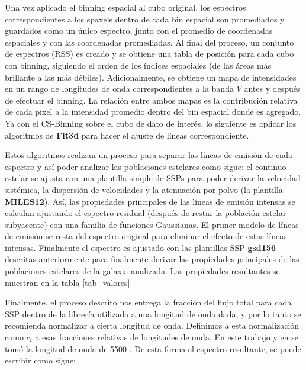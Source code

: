 \bigskip

\noindent Una  vez aplicado el binning espacial al cubo original, los espectros correspondientes a los spaxels dentro de cada bin espacial son promediados y guardados como un único espectro, junto con el promedio de coordenadas espaciales y con las coordenadas promediadas. Al final del proceso, un conjunto de espectros (RSS) es creado y se obtiene una tabla de posición para cada cubo con binning, siguiendo el orden de los índices espaciales (de las áreas más brillante a las  más débiles). Adicionalmente, se obtiene un mapa de intensidades en un rango de longitudes de onda correspondientes a la banda $V$ antes y después de efectuar el binning. La relación entre ambos mapas es la contribución relativa de cada pixel a la intensidad promedio dentro del bin espacial donde es agregado. Ya con el CS-Binning sobre el cubo de dato de interés, lo siguiente es aplicar los algoritmos  de \textbf{Fit3d} para hacer el ajuste de líneas correspondiente.




\bigskip

\noindent Estos algoritmos realizan un proceso para separar las líneas de emisión de cada espectro y así poder analizar las poblaciones estelares como sigue: el continuo estelar se ajusta con una plantilla simple de SSPs para poder derivar la velocidad sistémica, la dispersión de velocidades y la atenuación por polvo (la plantilla \textbf{MILES12}). Así, las propiedades principales de las líneas de emisión intensas se calculan ajustando el espectro residual (después de restar la población estelar subyacente) con una familia de funciones Gaussianas. El primer modelo de líneas de emisión se resta del espectro original para eliminar el efecto de estas líneas intensas. Finalmente el espectro es ajustado con las plantillas SSP \textbf{gsd156} descritas anteriormente para finalmente derivar las propiedades principales de las poblaciones estelares de la galaxia analizada. Las propiedades resultantes se muestran en la tabla \ref{tab_valores}


\bigskip


\noindent Finalmente, el proceso descrito nos entrega la fracción del flujo total para cada SSP dentro de la librería utilizada a una longitud de onda dada, y por lo tanto se recomienda normalizar a cierta longitud de onda. Definimos a esta normalización como $c_i$ a esas fracciones relativas de longitudes de onda. En este trabajo y en \citep{pipe1} se tomó la longitud de onda de 5500 \text{\AA}. De esta forma el espectro resultante, se puede escribir como sigue:

